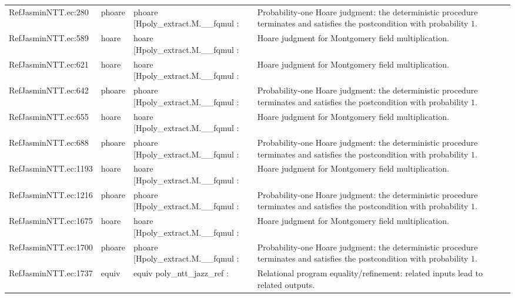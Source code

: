 \documentclass[10pt]{article}
\begin{document}
\begin{longtable}{L{0.11\textwidth}L{0.05\textwidth}L{0.38\textwidth}L{0.42\textwidth}}
RefJasminNTT.\allowbreak{}ec:\allowbreak{}280 & phoare & {\ttfamily\scriptsize phoare [Hpoly\_extract.M.\_\_fqmul :} & Probability-one Hoare judgment: the deterministic procedure terminates and satisfies the postcondition with probability $1$. \\
RefJasminNTT.\allowbreak{}ec:\allowbreak{}589 & hoare & {\ttfamily\scriptsize hoare [Hpoly\_extract.M.\_\_fqmul :} & Hoare judgment for Montgomery field multiplication. \\
RefJasminNTT.\allowbreak{}ec:\allowbreak{}621 & hoare & {\ttfamily\scriptsize hoare [Hpoly\_extract.M.\_\_fqmul :} & Hoare judgment for Montgomery field multiplication. \\
RefJasminNTT.\allowbreak{}ec:\allowbreak{}642 & phoare & {\ttfamily\scriptsize phoare [Hpoly\_extract.M.\_\_fqmul :} & Probability-one Hoare judgment: the deterministic procedure terminates and satisfies the postcondition with probability $1$. \\
RefJasminNTT.\allowbreak{}ec:\allowbreak{}655 & hoare & {\ttfamily\scriptsize hoare [Hpoly\_extract.M.\_\_fqmul :} & Hoare judgment for Montgomery field multiplication. \\
RefJasminNTT.\allowbreak{}ec:\allowbreak{}688 & phoare & {\ttfamily\scriptsize phoare [Hpoly\_extract.M.\_\_fqmul :} & Probability-one Hoare judgment: the deterministic procedure terminates and satisfies the postcondition with probability $1$. \\
RefJasminNTT.\allowbreak{}ec:\allowbreak{}1193 & hoare & {\ttfamily\scriptsize hoare [Hpoly\_extract.M.\_\_fqmul :} & Hoare judgment for Montgomery field multiplication. \\
RefJasminNTT.\allowbreak{}ec:\allowbreak{}1216 & phoare & {\ttfamily\scriptsize phoare [Hpoly\_extract.M.\_\_fqmul :} & Probability-one Hoare judgment: the deterministic procedure terminates and satisfies the postcondition with probability $1$. \\
RefJasminNTT.\allowbreak{}ec:\allowbreak{}1675 & hoare & {\ttfamily\scriptsize hoare [Hpoly\_extract.M.\_\_fqmul :} & Hoare judgment for Montgomery field multiplication. \\
RefJasminNTT.\allowbreak{}ec:\allowbreak{}1700 & phoare & {\ttfamily\scriptsize phoare [Hpoly\_extract.M.\_\_fqmul :} & Probability-one Hoare judgment: the deterministic procedure terminates and satisfies the postcondition with probability $1$. \\
RefJasminNTT.\allowbreak{}ec:\allowbreak{}1737 & equiv & {\ttfamily\scriptsize equiv poly\_ntt\_jazz\_ref :} & Relational program equality/refinement: related inputs lead to related outputs. \\

\end{longtable}
\end{document}
